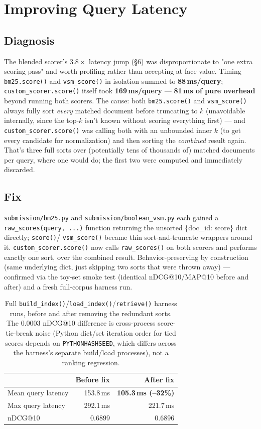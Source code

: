 \documentclass[11pt]{article}
\begin{document}
\section{Improving Query Latency}
\label{sec:latency}

\subsection{Diagnosis}
The blended scorer's $3.8\times$ latency jump (\S 6) was disproportionate
to "one extra scoring pass" and worth profiling rather than accepting at
face value. Timing \texttt{bm25.score()} and \texttt{vsm\_score()} in
isolation summed to \textbf{88\,ms/query}; \texttt{custom\_scorer.score()}
itself took \textbf{169\,ms/query} --- \textbf{81\,ms of pure overhead}
beyond running both scorers. The cause: both \texttt{bm25.score()} and
\texttt{vsm\_score()} always fully sort \emph{every} matched document
before truncating to $k$ (unavoidable internally, since the top-$k$
isn't known without scoring everything first) --- and
\texttt{custom\_scorer.score()} was calling both with an unbounded inner
$k$ (to get every candidate for normalization) and then sorting the
\emph{combined} result again. That's three full sorts over
(potentially tens of thousands of) matched documents per query, where
one would do; the first two were computed and immediately discarded.

\subsection{Fix}
\texttt{submission/bm25.py} and \texttt{submission/boolean\_vsm.py} each
gained a \texttt{raw\_scores(query, ...)} function returning the
unsorted \{doc\_id: score\} dict directly; \texttt{score()}/
\texttt{vsm\_score()} became thin sort-and-truncate wrappers around it.
\texttt{custom\_scorer.score()} now calls \texttt{raw\_scores()} on both
scorers and performs exactly one sort, over the combined result.
Behavior-preserving by construction (same underlying dict, just skipping
two sorts that were thrown away) --- confirmed via the toy-set smoke
test (identical nDCG@10/MAP@10 before and after) and a fresh full-corpus
harness run.

\begin{table}[h]
\centering
\begin{tabular}{lrr}
\toprule
 & Before fix & After fix \\
\midrule
Mean query latency & 153.8\,ms & \textbf{105.3\,ms (--32\%)} \\
Max query latency & 292.1\,ms & 221.7\,ms \\
nDCG@10 & 0.6899 & 0.6896 \\
\bottomrule
\end{tabular}
\caption{Full \texttt{build\_index()}/\texttt{load\_index()}/\texttt{retrieve()}
harness runs, before and after removing the redundant sorts. The
$0.0003$ nDCG@10 difference is cross-process score-tie-break noise
(Python dict/set iteration order for tied scores depends on
\texttt{PYTHONHASHSEED}, which differs across the harness's separate
build/load processes), not a ranking regression.}
\end{table}
\end{document}

